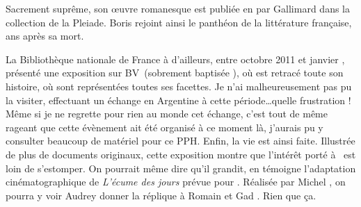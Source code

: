 Sacrement suprême, son \oe{}uvre romanesque est publiée en  par Gallimard dans la collection
de la Pleiade. Boris rejoint ainsi le panthéon de la littérature française,  ans après sa mort.

La Bibliothèque nationale de France à d'ailleurs, entre octobre 2011 et janvier , présenté
une exposition sur BV\ (sobrement baptisée \emph{\BV}), où est retracé toute son histoire, où sont
représentées toutes ses facettes. Je n'ai malheureusement pas pu la visiter, effectuant un échange en Argentine à cette période\ldots quelle frustration ! Même si je ne regrette pour rien au monde cet échange, c'est tout de même rageant que cette évènement ait été organisé à ce moment là, j'aurais pu y consulter beaucoup de matériel pour ce PPH. Enfin, la vie est ainsi faite. Illustrée de plus de  documents originaux, cette
exposition montre que l'intérêt porté à \BV\ est loin de s'estomper. On pourrait même dire qu'il
grandit, en témoigne l'adaptation cinématographique de \emph{L'écume des jours} prévue pour .
Réalisée par Michel , on pourra y voir Audrey  donner la réplique à
Romain  et Gad . Rien que ça.




